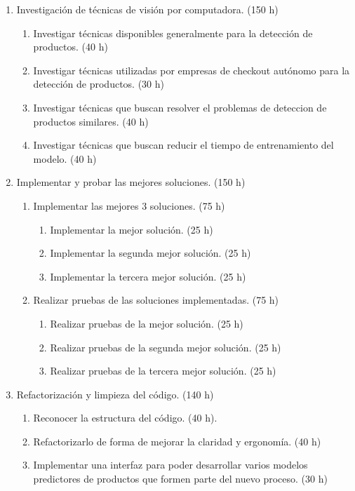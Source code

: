 \documentclass[
11pt, %
]{charter}
\begin{document}
\begin{enumerate}
\item Investigación de técnicas de visión por computadora. (150 h)
	\begin{enumerate}
		\item Investigar técnicas disponibles generalmente para la detección de productos. (40 h)
		\item Investigar técnicas utilizadas por empresas de checkout autónomo para la detección de productos. (30 h)
		\item Investigar técnicas que buscan resolver el problemas de deteccion de productos similares. (40 h)
		\item Investigar técnicas que buscan reducir el tiempo de entrenamiento del modelo. (40 h)
	\end{enumerate}
\item Implementar y probar las mejores soluciones. (150 h)
	\begin{enumerate}
	\item Implementar las mejores 3 soluciones. (75 h)
		\begin{enumerate}
			\item Implementar la mejor solución. (25 h)
			\item Implementar la segunda mejor solución. (25 h)
			\item Implementar la tercera mejor solución. (25 h)
		\end{enumerate}
	\item Realizar pruebas de las soluciones implementadas. (75 h)
		\begin{enumerate}
			\item Realizar pruebas de la mejor solución. (25 h)
			\item Realizar pruebas de la segunda mejor solución. (25 h)
			\item Realizar pruebas de la tercera mejor solución. (25 h)
		\end{enumerate}
	\end{enumerate}
\item Refactorización y limpieza del código. (140 h)
		\begin{enumerate}
			\item Reconocer la estructura del código. (40 h).
			\item Refactorizarlo de forma de mejorar la claridad y ergonomía. (40 h)
			\item Implementar una interfaz para poder desarrollar varios modelos predictores de productos que formen parte del nuevo proceso. (30 h)

\end{enumerate}
\end{enumerate}
\end{document}
